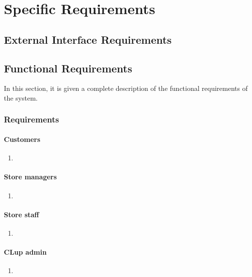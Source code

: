\chapter{Specific Requirements}

\section{External Interface Requirements}

\section{Functional Requirements}
In this section, it is given a complete description of the functional requirements of the system.

    \subsection{Requirements}
    \subsubsection{Customers}
        \begin{enumerate}[label=\textbf{R.\arabic*}]
            \item
        \end{enumerate}

    \subsubsection{Store managers}
    \begin{enumerate}[label=\textbf{R.\arabic*}]
        \item
    \end{enumerate}

    \subsubsection{Store staff}
    \begin{enumerate}[label=\textbf{R.\arabic*}]
        \item
    \end{enumerate}

    \subsubsection{CLup admin}
    \begin{enumerate}[label=\textbf{R.\arabic*}]
        \item
    \end{enumerate}

